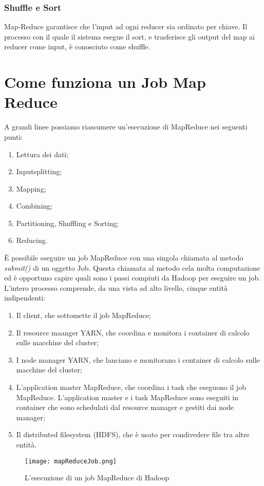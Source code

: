 \subsubsection{Shuffle e Sort}
Map-Reduce garantisce che l'input ad ogni reducer sia ordinato per chiave. Il processo con il quale il sistema esegue il sort, e trasferisce gli output del map ai reducer come input, è conosciuto come shuffle.
\section{Come funziona un Job Map Reduce}
A grandi linee possiamo riassumere un'esecuzione di MapReduce nei seguenti punti:
\begin{enumerate}
  \item Lettura dei dati;
  \item Inputsplitting;
  \item Mapping;
  \item Combining; 
  \item Partitioning, Shuffling e Sorting;
  \item Reducing.
\end{enumerate}
È possibile eseguire un job MapReduce con una singola chiamata al metodo \textit{submit()} di un oggetto Job. Questa chiamata al metodo cela molta computazione ed è opportuno capire quali sono i passi compiuti da Hadoop  per eseguire un job. L'intero processo comprende, da una vista ad alto livello, cinque entità indipendenti:
\begin{enumerate}
  \item Il client, che sottomette il job MapReduce;
  \item Il resource maanger YARN, che coordina e monitora i container di calcolo sulle macchine del cluster;
  \item I node manager YARN, che lanciano e monitorano i container di calcolo sulle macchine del cluster;
  \item L'application master MapReduce, che coordina i task che eseguono il job MapReduce. L'application master e i task MapReduce sono eseguiti in container che sono schedulati dal resource manager e gestiti dai node manager;
  \item Il distributed filesystem (HDFS), che è usato per condivedere file tra altre entità.
\end{enumerate}
\begin{figure}
  \begin{center}
    \texttt{[image: mapReduceJob.png]}
    \caption{L'esecuzione di un job MapReduce di Hadoop}
    \label{fig:job}
  \end{center}
\end{figure}
